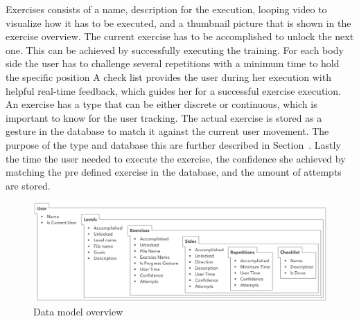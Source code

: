Exercises consists of a name, description for the execution, looping video to visualize how it has to be executed, and a thumbnail picture that is shown in the exercise overview.
The current exercise has to be accomplished to unlock the next one.
This can be achieved by successfully executing the training.
For each body side the user has to challenge several repetitions with a minimum time to hold the specific position
A check list provides the user during her execution with helpful real-time feedback, which guides her for a successful exercise execution.
An exercise has a type that can be either discrete or continuous, which is important to know for the user tracking. The actual exercise is stored as a gesture in the database to match it against the current user movement. The purpose of the type and database this are further described in Section~\textit{}. 
Lastly the time the user needed to execute the exercise, the confidence she achieved by matching the pre defined exercise in the database, and the amount of attempts are stored.

\begin{figure}[htb]
	\centering
	\begin{minipage}[t]{1\linewidth}
		\centering
		\includegraphics[width=1\linewidth]{Pictures/5_2_dataModel}
		\caption{Data model overview}
		\label{fig:5_2_dataModel}
	\end{minipage}
\end{figure}

